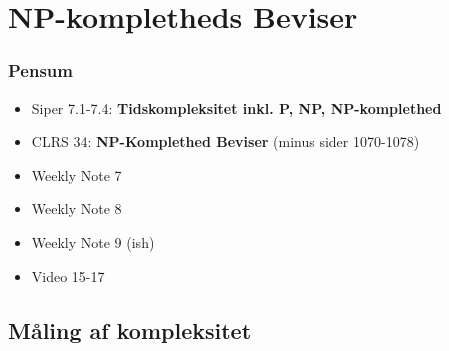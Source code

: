 \section{NP-kompletheds Beviser}%
\label{sec:npkomplethed}

\begin{frame}
	\frametitle{Pensum}
	\begin{itemize}
		\item Siper 7.1-7.4: \textbf{Tidskompleksitet inkl. P, NP, NP-komplethed}
		\item CLRS 34: \textbf{NP-Komplethed Beviser} (minus sider 1070-1078)
		\item Weekly Note 7
		\item Weekly Note 8
		\item Weekly Note 9 (ish)
		\item Video 15-17
	\end{itemize}
\end{frame}

\subsection{Måling af kompleksitet}%
\label{subsec:label}


